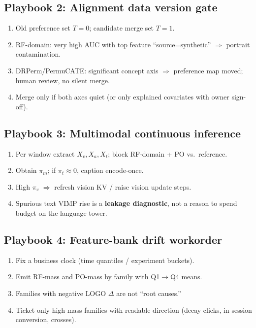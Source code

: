 \documentclass[11pt,a4paper]{article}
\begin{document}
\subsection{Playbook 2: Alignment data version gate}
\begin{enumerate}
  \item Old preference set \(T=0\); candidate merge set \(T=1\).
  \item RF-domain: very high AUC with top feature ``source=synthetic'' \(\Rightarrow\) portrait contamination.
  \item DRPerm/PermuCATE: significant concept axis \(\Rightarrow\) preference map moved; human review, no silent merge.
  \item Merge only if both axes quiet (or only explained covariates with owner sign-off).
\end{enumerate}

\subsection{Playbook 3: Multimodal continuous inference}
\begin{enumerate}
  \item Per window extract \(X_v,X_a,X_t\); block RF-domain + PO vs.\ reference.
  \item Obtain \(\pi_m\); if \(\pi_t\approx 0\), caption encode-once.
  \item High \(\pi_v\) \(\Rightarrow\) refresh vision KV / raise vision update steps.
  \item Spurious text VIMP rise is a \textbf{leakage diagnostic}, not a reason to spend budget on the language tower.
\end{enumerate}

\subsection{Playbook 4: Feature-bank drift workorder}
\begin{enumerate}
  \item Fix a business clock (time quantiles / experiment buckets).
  \item Emit RF-mass and PO-mass by family with Q1\(\to\)Q4 means.
  \item Families with negative LOGO \(\Delta\) are not ``root causes.''
  \item Ticket only high-mass families with readable direction (decay clicks, in-session conversion, crosses).
\end{enumerate}
\end{document}
